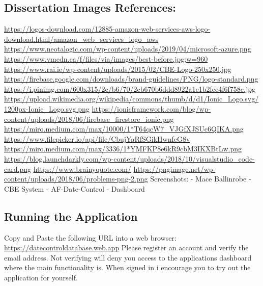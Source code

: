 \subsection{Dissertation Images References:}
\url{https://logos-download.com/12885-amazon-web-services-aws-logo-download.html/amazon_web_services_logo_aws}
\newline
\url{https://www.neotalogic.com/wp-content/uploads/2019/04/microsoft-azure.png}
\newline
\url{https://www.vmcdn.ca/f/files/via/images/best-before.jpg;w=960}
\newline
\url{https://www.rai.ie/wp-content/uploads/2015/02/CBE-Logo-250x250.jpg}
\newline
\url{https://firebase.google.com/downloads/brand-guidelines/PNG/logo-standard.png}
\newline
\url{https://i.pinimg.com/600x315/2c/b6/70/2cb670b6ddd8922a1c1b2fee4f6f758c.jpg}
\newline
\url{https://upload.wikimedia.org/wikipedia/commons/thumb/d/d1/Ionic_Logo.svg/1200px-Ionic_Logo.svg.png}
\newline
\url{https://ionicframework.com/blog/wp-content/uploads/2018/06/firebase_firestore_ionic.png}
\newline
\url{https://miro.medium.com/max/10000/1*T64qcW7_VJGfXJSUc6QIKA.png}
\newline
\url{https://www.filepicker.io/api/file/CbujYaRfSGikHwnfeG8v}
\newline
\url{https://miro.medium.com/max/3336/1*YMFKP8e6kR9cbM3IKXBtLw.png}
\newline
\url{https://blog.launchdarkly.com/wp-content/uploads/2018/10/visualstudio_code-card.png}
\newline
\url{https://www.brainyquote.com/}
\newline
\url{https://pngimage.net/wp-content/uploads/2018/06/problems-png-2.png}
\newline
Screenshots:
\newline
- Mace Ballinrobe - CBE System 
\newline
- AF-Date-Control - Dashboard
\newline

\subsection{Running the Application}
Copy and Paste the following URL into a web browser:
\newline
\url{https://datecontroldatabase.web.app}
\newline
Please register an account and verify the email address. Not verifying will deny you access to the applications dashboard where the main functionality is. When signed in i encourage you to try out the application for yourself.
\newline

